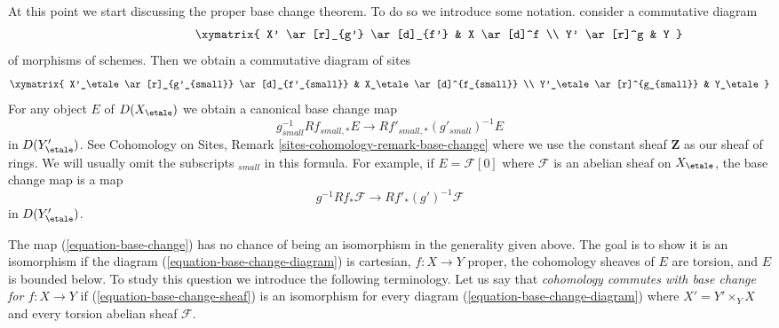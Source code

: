 \noindent
At this point we start discussing the proper base change theorem.
To do so we introduce some notation. consider a commutative diagram
\begin{equation}
\label{equation-base-change-diagram}
\vcenter{
\xymatrix{
X' \ar[r]_{g'} \ar[d]_{f'} & X \ar[d]^f \\
Y' \ar[r]^g & Y
}
}
\end{equation}
of morphisms of schemes. Then we obtain a commutative diagram of sites
$$
\xymatrix{
X'_\etale \ar[r]_{g'_{small}} \ar[d]_{f'_{small}} &
X_\etale \ar[d]^{f_{small}} \\
Y'_\etale \ar[r]^{g_{small}} &
Y_\etale
}
$$
For any object $E$ of $D(X_\etale)$ we obtain a canonical base change map
\begin{equation}
\label{equation-base-change}
g_{small}^{-1}Rf_{small, *}E \longrightarrow Rf'_{small, *}(g'_{small})^{-1}E
\end{equation}
in $D(Y'_\etale)$. See Cohomology on Sites, Remark
\ref{sites-cohomology-remark-base-change} where we use the constant
sheaf $\mathbf{Z}$ as our sheaf of rings.
We will usually omit the subscripts ${}_{small}$ in this formula.
For example, if $E = \mathcal{F}[0]$ where $\mathcal{F}$ is an abelian
sheaf on $X_\etale$, the base change map is a map
\begin{equation}
\label{equation-base-change-sheaf}
g^{-1}Rf_*\mathcal{F} \longrightarrow Rf'_*(g')^{-1}\mathcal{F}
\end{equation}
in $D(Y'_\etale)$.

\medskip\noindent
The map (\ref{equation-base-change}) has no chance of being an isomorphism
in the generality given above. The goal is to show
it is an isomorphism if the diagram (\ref{equation-base-change-diagram})
is cartesian, $f : X \to Y$ proper, the cohomology sheaves of $E$
are torsion, and $E$ is bounded below.
To study this question we introduce the following terminology.
Let us say that {\it cohomology commutes with base change
for $f : X \to Y$} if (\ref{equation-base-change-sheaf})
is an isomorphism for every diagram (\ref{equation-base-change-diagram})
where $X' = Y' \times_Y X$ and every torsion abelian sheaf $\mathcal{F}$.
